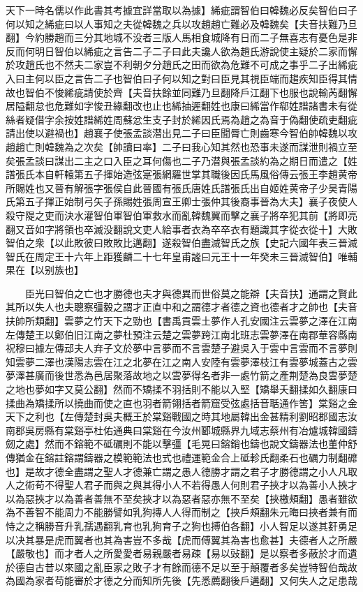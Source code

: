 天下一時名儒以作此書其考據宜詳當取以為據】絺疵謂智伯曰韓魏必反矣智伯曰子何以知之絺疵曰以人事知之夫從韓魏之兵以攻趙趙亡難必及韓魏矣【夫音扶難乃旦翻】今約勝趙而三分其地城不没者三版人馬相食城降有日而二子無喜志有憂色是非反而何明日智伯以絺疵之言告二子二子曰此夫讒人欲為趙氏游說使主疑於二家而懈於攻趙氏也不然夫二家豈不利朝夕分趙氏之田而欲為危難不可成之事乎二子出絺疵入曰主何以臣之言告二子也智伯曰子何以知之對曰臣見其視臣端而趨疾知臣得其情故也智伯不悛絺疵請使於齊【夫音扶餘並同難乃旦翻降戶江翻下也服也說輸芮翻懈居隘翻怠也危難如字悛丑緣翻改也止也絺抽遲翻姓也康曰絺當作郗姓譜諸書未有從絲者疑借字余按姓譜絺姓周蘇忿生支子封於絺因氏焉為趙之為音于偽翻使疏吏翻疵請出使以避禍也】趙襄子使張孟談潜出見二子曰臣聞脣亡則齒寒今智伯帥韓魏以攻趙趙亡則韓魏為之次矣【帥讀曰率】二子曰我心知其然也恐事未遂而謀泄則禍立至矣張孟談曰謀出二主之口入臣之耳何傷也二子乃潜與張孟談約為之期日而遣之【姓譜張氏本自軒轅第五子揮始造弦寔張網羅世掌其職後因氏馬風俗傳云張王李趙黄帝所賜姓也又晉有解張字張侯自此晉國有張氏唐姓氏譜張氏出自姬姓黄帝子少昊青陽氏第五子揮正始制弓矢子孫賜姓張周宣王卿士張仲其後裔事晉為大夫】襄子夜使人殺守隄之吏而決水灌智伯軍智伯軍救水而亂韓魏翼而擊之襄子將卒犯其前【將即亮翻又音如字將領也卒滅没翻說文吏人給事者衣為卒卒衣有題識其字從衣從十】大敗智伯之衆【以此敗彼曰敗敗比邁翻】遂殺智伯盡滅智氏之族【史記六國年表三晉滅智氏在周定王十六年上距獲麟二十七年皇甫謐曰元王十一年癸未三晉滅智伯】唯輔果在【以别族也】

　　臣光曰智伯之亡也才勝德也夫才與德異而世俗莫之能辯【夫音扶】通謂之賢此其所以失人也夫聰察彊毅之謂才正直中和之謂德才者德之資也德者才之帥也【夫音扶帥所類翻】雲夢之竹天下之勁也【書禹貢雲土夢作人孔安國注云雲夢之澤在江南左傳楚王以鄭伯旧江南之夢杜預注云楚之雲夢跨江南北班志雲夢澤在南郡華容縣南祝穆曰據左傳䢵夫人弃子文於夢中言夢而不言雲楚子避吳入于雲中言雲而不言夢則知雲夢二澤也漢陽志雲在江之北夢在江之南人安陸有雲夢澤枝江有雲夢城蓋古之雲夢澤甚廣而後世悉為邑居聚落故地之以雲夢得名者非一處竹箭之產荆楚為良雲夢楚之地也夢如字又莫公翻】然而不矯揉不羽括則不能以入堅【矯舉夭翻揉如久翻康曰揉曲為矯揉所以撓曲而使之直也羽者箭翎括者箭窟受弦處括音聒通作筈】棠谿之金天下之利也【左傳楚封吳夫概王於棠谿戰國之時其地屬韓出金甚精利劉昭郡國志汝南郡吳房縣有棠谿亭杜佑通典曰棠谿在今汝州郾城縣界九域志蔡州有冶爐城韓國鑄劒之處】然而不鎔範不砥礪則不能以擊彊【毛晃曰鎔銷也鑄也說文鑄器法也董仲舒傳猶金在鎔註鎔謂鑄器之模範範法也式也禮運範金合上砥軫氏翻柔石也礪力制翻䃺也】是故才德全盡謂之聖人才德兼亡謂之愚人德勝才謂之君子才勝德謂之小人凡取人之術苟不得聖人君子而與之與其得小人不若得愚人何則君子挾才以為善小人挾才以為惡挾才以為善者善無不至矣挾才以為惡者惡亦無不至矣【挾檄頰翻】愚者雖欲為不善智不能周力不能勝譬如乳狗摶人人得而制之【挾戶頰翻朱元晦曰挾者兼有而恃之之稱勝音升乳孺遇翻乳育也乳狗育子之狗也搏伯各翻】小人智足以遂其姧勇足以决其暴是虎而翼者也其為害豈不多哉【虎而傅翼其為害也愈甚】夫德者人之所嚴【嚴敬也】而才者人之所愛愛者易親嚴者易疎【易以䜴翻】是以察者多蔽於才而遺於德自古昔以來國之亂臣家之敗子才有餘而德不足以至于顛覆者多矣豈特智伯哉故為國為家者苟能審於才德之分而知所先後【先悉薦翻後戶遘翻】又何失人之足患哉

